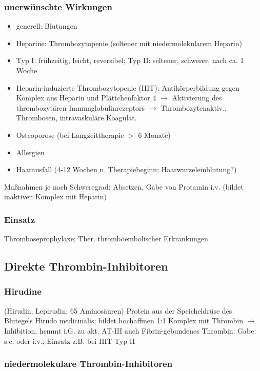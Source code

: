 \documentclass[10pt,a4paper]{report}
\begin{document}
\subsubsection{unerwünschte Wirkungen} %
\label{par:unerw_nschte_wirkungen}
\begin{itemize}
	\item generell: Blutungen
	\item Heparine:	Thrombozytopenie (seltener mit niedermolekularem Heparin)
	\item Typ I:  frühzeitig, leicht, reversibel; Typ II: seltener, schwerer, nach ca. 1 Woche
	\item Heparin-induzierte Thrombozytopenie (HIT): Antikörperbildung gegen Komplex aus Heparin und Plättchenfaktor 4 $\rightarrow$ Aktivierung des thrombozytären Immunglobulinrezeptors $\rightarrow$ Thrombozytenaktiv., Thrombosen, intravaskuläre Koagulat.
	\item Osteoporose (bei Langzeittherapie $>$ 6 Monate)  
	\item Allergien 
	\item Haarausfall (4-12 Wochen n. Therapiebeginn; Haarwurzeleinblutung?)
\end{itemize}
Maßnahmen je nach Schweregrad: Absetzen, Gabe von Protamin i.v. (bildet inaktiven Komplex mit Heparin)
\subsubsection{Einsatz} %
\label{par:einsatz}
Thromboseprophylaxe; Ther. thromboembolischer Erkrankungen
\subsection{Direkte Thrombin-Inhibitoren} %
\label{ssec:direkte_thrombin_inhibitoren}
\subsubsection{Hirudine} %
\label{par:hirudine}
(Hirudin,  Lepirudin;  65 Aminosäuren) Protein aus der Speicheldrüse des Blutegels Hirudo medicinalis; bildet hochaffinen 1:1 Komplex mit Thrombin $\rightarrow$ Inhibition; hemmt i.G. zu akt. AT-III 	auch Fibrin-gebundenes Thrombin; Gabe: s.c. oder i.v.; Einsatz z.B. bei HIT Typ II
\subsubsection{niedermolekulare Thrombin-Inhibitoren} %
\label{par:niedermolekulare_thrombin_inhibitoren}
\end{document}
